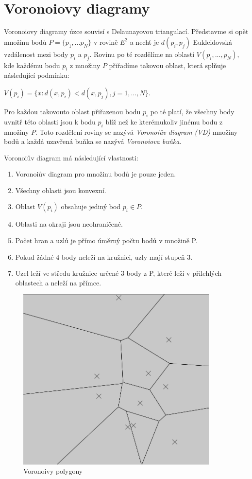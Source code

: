\documentclass[12pt,a4paper]{article}
\begin{document}
\newpage
\section{Voronoiovy diagramy}

Voronoiovy diagramy úzce souvisí s Delaunayovou triangulací. Představme si opět množinu bodů $P = \{p_1,...p_N\} $ v rovině $E^2$ a nechť je $d(p_i,p_j) $ Eukleidovská vzdálenost mezi body $p_i$ a $p_j$. Rovinu po té rozdělíme na oblasti $V(p_i,...,p_N)$, kde každému bodu $p_i$ z množiny $P$ přiřadíme takovou oblast, která splňuje následující podmínku: 

$V(p_i) = \{ x: d(x, p_i) < d(x, p_j), j = 1,...,N\}$.

Pro každou takovouto oblast přiřazenou bodu $p_i$ po té platí, že všechny body uvnitř této oblasti jsou k bodu $p_i$ blíž než ke kterémukoliv jinému bodu z množiny $P$. Toto rozdělení roviny se nazývá \textit{Voronoiův diagram (VD)} množiny bodů a každá uzavřená buňka se nazývá \textit{Voronoiova buňka.}

\bigskip
Voronoiův diagram má následující vlastnosti: 
\begin{enumerate}
\item Voronoiův diagram pro množinu bodů je pouze jeden.
\item Všechny oblasti jsou konvexní.
\item Oblast $V(p_i)$ obsahuje jediný bod $p_i \in P$.
\item Oblasti na okraji jsou neohraničené.
\item Počet hran a uzlů je přímo úměrný počtu bodů v množině P.
\item Pokud žádné 4 body neleží na kružnici, uzly mají stupeň 3.
\item Uzel leží ve středu kružnice určené 3 body z P, které leží v přilehlých oblastech a neleží na přímce.
\end{enumerate}

\begin{figure}[h!]
\centering
\includegraphics[width=0.9\textwidth]{../img/vor_pol.png}
\caption{Voronoivy polygony}
\label{fig:vor_pol}
\end{figure}
\end{document}
